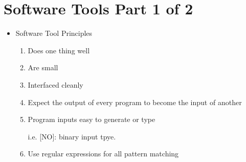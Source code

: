 \documentclass[12pt]{article}
\begin{document}
\section*{Software Tools Part 1 of 2}
\begin{itemize}
    \item Software Tool Principles
    \begin{enumerate}[1.]
        \item Does one thing well
        \item Are small
        \item Interfaced cleanly
        \item Expect the output of every program to become the input of another
        \item Program inputs easy to generate or type

        \bigskip

        i.e. [NO]: binary input tpye.
        \item Use regular expressions for all pattern matching
    \end{enumerate}
\end{itemize}
\end{document}
